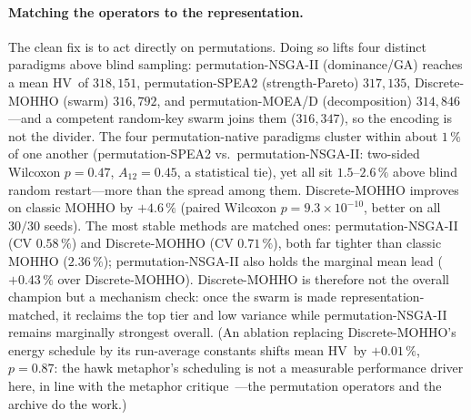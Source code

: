 \documentclass[runningheads]{llncs}
\newcommand{\HV}{\textsf{HV}}
\begin{document}
\paragraph{Matching the operators to the representation.}
The clean fix is to act directly on permutations. Doing so lifts four distinct paradigms above blind sampling: permutation-NSGA-II (dominance/GA) reaches a mean \HV\ of $318{,}151$, permutation-SPEA2 (strength-Pareto) $317{,}135$, Discrete-MOHHO (swarm) $316{,}792$, and permutation-MOEA/D (decomposition) $314{,}846$---and a competent random-key swarm joins them ($316{,}347$), so the encoding is not the divider. The four permutation-native paradigms cluster within about $1\,\%$ of one another (permutation-SPEA2 vs.\ permutation-NSGA-II: two-sided Wilcoxon $p=0.47$, $A_{12}=0.45$, a statistical tie), yet all sit $1.5$--$2.6\,\%$ above blind random restart---more than the spread among them. Discrete-MOHHO improves on classic MOHHO by $+4.6\,\%$ (paired Wilcoxon $p=9.3\times10^{-10}$, better on all $30/30$ seeds). The most stable methods are matched ones: permutation-NSGA-II (CV $0.58\,\%$) and Discrete-MOHHO (CV $0.71\,\%$), both far tighter than classic MOHHO ($2.36\,\%$); permutation-NSGA-II also holds the marginal mean lead ($+0.43\,\%$ over Discrete-MOHHO). Discrete-MOHHO is therefore not the overall champion but a mechanism check: once the swarm is made representation-matched, it reclaims the top tier and low variance while permutation-NSGA-II remains marginally strongest overall. (An ablation replacing Discrete-MOHHO's energy schedule by its run-average constants shifts mean \HV\ by $+0.01\,\%$, $p=0.87$: the hawk metaphor's scheduling is not a measurable performance driver here, in line with the metaphor critique~\cite{aranha,sorensen}---the permutation operators and the archive do the work.)
\end{document}

